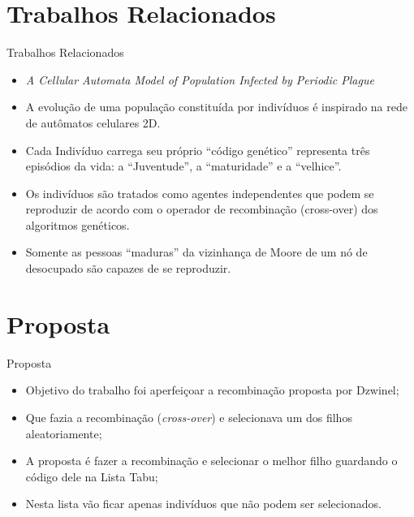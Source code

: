 \documentclass{beamer}
\begin{document}
\section{Trabalhos Relacionados}
\begin{frame}{Trabalhos Relacionados}
	\begin{itemize}
		\item \textit{A Cellular Automata Model of Population Infected by
		Periodic Plague} \cite{dzwinel:04}
		\item A evolução de uma população constituída por indivíduos é
		inspirado na rede de autômatos celulares 2D.
		\item Cada Indivíduo carrega seu próprio ``código genético''
		representa três episódios da vida: a ``Juventude'', a ``maturidade'' e
		a ``velhice''.
		\item Os indivíduos são tratados como agentes independentes que podem
		se reproduzir de acordo com o operador de recombinação (cross-over)
		dos algoritmos genéticos.
		\item Somente as pessoas ``maduras'' da vizinhança de Moore de um nó
		de desocupado são capazes de se reproduzir.
	\end{itemize}
\end{frame}

\section{Proposta}
\begin{frame}{Proposta}
	\begin{itemize}
		\item Objetivo do trabalho foi aperfeiçoar a recombinação proposta
		por Dzwinel;
		\item Que fazia a recombinação (\textit{cross-over}) e selecionava
		um dos filhos aleatoriamente;
		\item A proposta é fazer a recombinação e selecionar o melhor filho
		guardando o código dele na Lista Tabu;
		\item Nesta lista vão ficar apenas indivíduos que não podem ser
		selecionados.  
	\end{itemize}
\end{frame}
\end{document}
